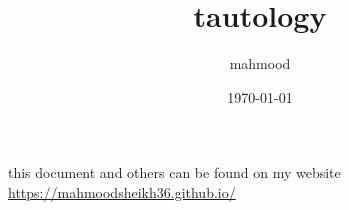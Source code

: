 \documentclass[a4paper,12pt]{article}
\author{mahmood}
\date{\today}
\title{tautology}
\begin{document}
\maketitle
\begin{note}
this document and others can be found on my website\\
\url{https://mahmoodsheikh36.github.io/}
\end{note}
\end{document}
